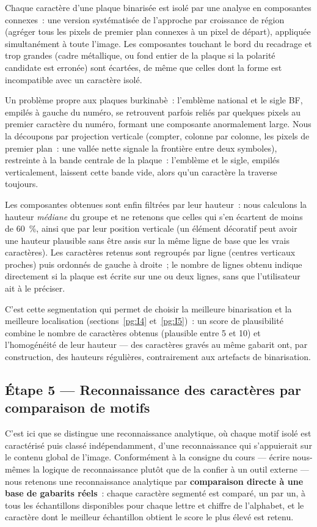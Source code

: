 \documentclass[11pt,a4paper]{article}
\begin{document}
Chaque caractère d'une plaque binarisée est isolé par une analyse en composantes connexes~: une version systématisée de l'approche par croissance de région (agréger tous les pixels de premier plan connexes à un pixel de départ), appliquée simultanément à toute l'image. Les composantes touchant le bord du recadrage et trop grandes (cadre métallique, ou fond entier de la plaque si la polarité candidate est erronée) sont écartées, de même que celles dont la forme est incompatible avec un caractère isolé.

Un problème propre aux plaques burkinabè~: l'emblème national et le sigle \og{}BF\fg{}, empilés à gauche du numéro, se retrouvent parfois reliés par quelques pixels au premier caractère du numéro, formant une composante anormalement large. Nous la découpons par projection verticale (compter, colonne par colonne, les pixels de premier plan~: une vallée nette signale la frontière entre deux symboles), restreinte à la bande centrale de la plaque~: l'emblème et le sigle, empilés verticalement, laissent cette bande vide, alors qu'un caractère la traverse toujours.

Les composantes obtenues sont enfin filtrées par leur hauteur~: nous calculons la hauteur \emph{médiane} du groupe et ne retenons que celles qui s'en écartent de moins de 60~\%, ainsi que par leur position verticale (un élément décoratif peut avoir une hauteur plausible sans être assis sur la même ligne de base que les vrais caractères). Les caractères retenus sont regroupés par ligne (centres verticaux proches) puis ordonnés de gauche à droite~; le nombre de lignes obtenu indique directement si la plaque est écrite sur une ou deux lignes, sans que l'utilisateur ait à le préciser.

C'est cette segmentation qui permet de choisir la meilleure binarisation et la meilleure localisation (sections~\ref{pg:I4} et~\ref{pg:I5})~: un score de plausibilité combine le nombre de caractères obtenus (plausible entre 5 et 10) et l'homogénéité de leur hauteur --- des caractères gravés au même gabarit ont, par construction, des hauteurs régulières, contrairement aux artefacts de binarisation.

\subsection{Étape 5 --- Reconnaissance des caractères par comparaison de motifs}
\label{pg:I7}

C'est ici que se distingue une reconnaissance analytique, où chaque motif isolé est caractérisé puis classé indépendamment, d'une reconnaissance qui s'appuierait sur le contenu global de l'image. Conformément à la consigne du cours --- écrire nous-mêmes la logique de reconnaissance plutôt que de la confier à un outil externe --- nous retenons une reconnaissance analytique par \textbf{comparaison directe à une base de gabarits réels}~: chaque caractère segmenté est comparé, un par un, à tous les échantillons disponibles pour chaque lettre et chiffre de l'alphabet, et le caractère dont le meilleur échantillon obtient le score le plus élevé est retenu.
\end{document}
